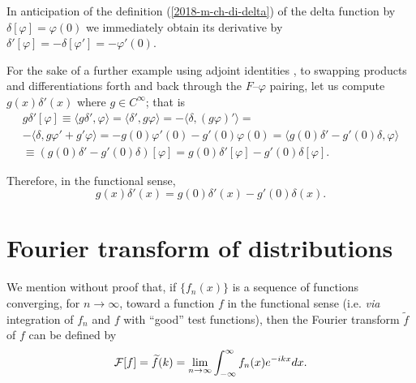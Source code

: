 {
\color{blue}
\bexample

In anticipation of the definition (\ref{2018-m-ch-di-delta}) of the delta function by $\delta [\varphi ]=\varphi (0)$
we immediately obtain its derivative by $\delta' [\varphi ]= - \delta[\varphi '  ]=-\varphi' (0)$.


For the sake of a further example using   adjoint identities
,
to swapping products and differentiations forth and back
through the $F$--$\varphi$ pairing, let us compute
$g(x)\delta' (x)$ where $g \in C^\infty$; that is
\begin{equation}
\begin{split}
g \delta' [\varphi ] \equiv
\langle g \delta'   , \varphi \rangle
=
\langle \delta'   , g  \varphi \rangle
 =
- \langle \delta   , (g  \varphi )'\rangle
 =  \\
- \langle \delta   ,  g  \varphi  '+ g'  \varphi  \rangle
 =
-  g(0)  \varphi ' (0) - g'(0)  \varphi(0)
 =
  \langle g(0) \delta '   -  g'(0)\delta , \varphi   \rangle
\\ \equiv
\left(g(0)\delta ' -g'(0)\delta \right) [\varphi ]
= g(0)\delta '[\varphi] -g'(0)\delta [\varphi ]
.
\end{split}
\end{equation}
\eexample
}
Therefore,  in the functional sense,
\begin{equation}
g(x)\delta' (x)=g(0) \delta '(x)   -  g'(0)\delta (x) .
\label{2012-m-ch-di-sederi}
\end{equation}




\section{Fourier transform  of distributions}
\label{2012-m-ch-di-ftgeneraldefcon}

We mention without proof that, if $\{ f_n(x)\}$ is a sequence of functions converging, for $n\rightarrow \infty$,
toward a function $f$ in the functional sense (i.e. {\it via}
integration of $f_n$ and $f$ with ``good'' test functions),
then the Fourier transform $\widetilde f$ of $f$ can be defined by\cite{Lighthill,Howell,doi:10.1080/0020739900210418}
\begin{equation}
\begin{split}
 {\cal F}[f]=\widetilde{f}(k)= \lim_{n\rightarrow \infty}
 \int_{-\infty}^\infty  f_n(x) e^{-i{kx}} dx
.
\end{split}
\end{equation}

